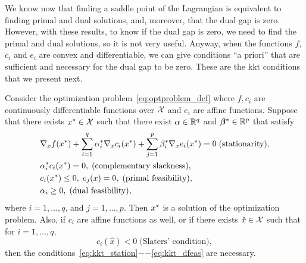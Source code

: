 %
We know now that finding a saddle point of the Lagrangian is equivalent to finding primal and dual solutions, and, moreover, that the dual gap is zero.
However, with these results, to know if the dual gap is zero, we need to find the primal and dual solutions, so it is not very useful.
Anyway, when the functions $f$, $c_i$ and $e_i$ are convex and differentiable, we can give conditions ``a priori'' that are sufficient and necessary for the dual gap to be zero. These are the \acrshort{kkt} conditions that we present next.
\begin{theorem}\label{th:kkt_conditions}
    Consider the optimization problem~\eqref{eq:optproblem_def} where $f, c_i$ are continuously differentiable functions over $\mathcal{X}$ and $e_i$ are affine functions. Suppose that there exists ${x}^* \in \mathcal{X}$ such that there exist $\alpha \in \mathbb{R}^q$ and ${\bm{\beta}}^* \in \mathbb{R}^p$ that satisfy
    \begin{align}
        &\nabla_x f(\opt{x}) + \sum_{i=1}^q \opt{\alpha}_i \nabla_x c_i(\opt{x}) + \sum_{j=1}^p \opt{\beta}_i \nabla_x e_i(\opt{x}) = 0 \; \text{(stationarity)}, \label{eq:kkt_station} \\
        &\opt{\alpha}_i c_i(\opt{x}) = 0, \; \text{(complementary slackness)}, \label{eq:kkt_comp}\\
        &c_i(\opt{x}) \leq 0 , \; e_j(x) = 0, \; \text{(primal feasibility)}, \label{eq:kkt_pfeas}\\
        &\alpha_i \geq 0,\;  \text{(dual feasibility)} , \label{eq:kkt_dfeas}
    \end{align}  
    where $i=1, \ldots, q$, and $j=1, \ldots, p$. Then ${x}^*$ is a solution of the optimization problem.
    Also, if $c_i$ are affine functions as well, or if there exists $\hat{x} \in \mathcal{X}$ such that for $i=1, \ldots, q$, 
    \begin{equation}
        \nonumber
        c_i(\hat{x}) < 0 \; \text{(Slaters' condition)},
    \end{equation}
    then the conditions~\eqref{eq:kkt_station}$--$\eqref{eq:kkt_dfeas} are necessary.
\end{theorem}
